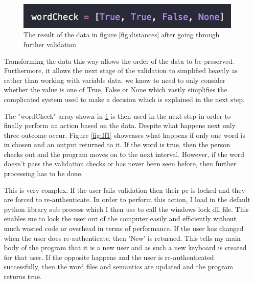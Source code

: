 \documentclass[10pt,a4paper]{report}
\begin{document}
\begin{figure}[h]
	\centering
	\includegraphics{WordCheck}
	\caption{The result of the data in figure \ref{fig:distances} after going through further validation}
	\label{fig:wordCheck}
\end{figure}

Transforming the data this way allows the order of the data to be preserved. Furthermore, it allows the next stage of the validation to simplified heavily as rather than working with variable data, we know to need to only consider whether the value is one of True, False or None which vastly simplifies the complicated system used to make a decision which is explained in the next step.

The "wordCheck" array shown in \ref{fig:wordCheck} is then used in the next step in order to finally perform an action based on the data. Despite what happens next only three outcome occur. Figure \ref{fig:If1} showcases what happens if only one word is in chosen and an output returned to it. If the word is true, then the person checks out and the program moves on to the next interval. However, if the word doesn't pass the validation checks or has never been seen before, then further processing has to be done. 

This is very complex. If the user fails validation then their pc is locked and they are forced to re-authenticate. In order to perform this action, I load in the default python library sub process \cite{subprocess} which I then use to call the windows lock dll file. This enables me to lock the user out of the computer easily and efficiently without much wasted code or overhead in terms of performance. If the user has changed when the user does re-authenticate, then 'New' is returned. This tells my main body of the program that it is a new user and as such a new keyboard is created for that user. If the opposite happens and the user is re-authenticated successfully, then the word files and semantics are updated and the program returns true.
\end{document}
